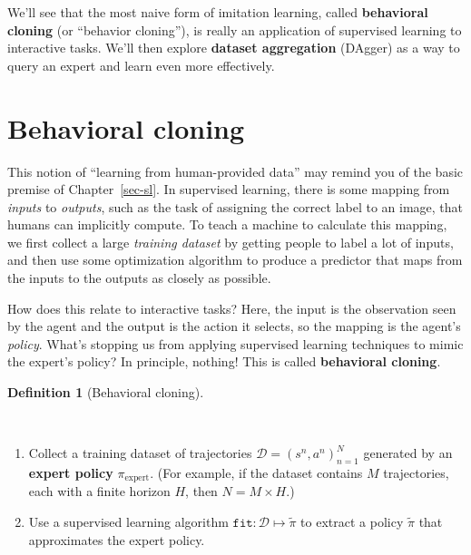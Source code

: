 \documentclass[
  letterpaper,
  DIV=11,
  numbers=noendperiod]{scrreprt}
\providecommand{\tightlist}{%
  \setlength{\itemsep}{0pt}\setlength{\parskip}{0pt}}\usepackage{longtable,booktabs,array}
\theoremstyle{plain}
\theoremstyle{plain}
\theoremstyle{definition}
\theoremstyle{definition}
\newtheorem{definition}{Definition}[chapter]
\theoremstyle{remark}
\begin{document}
We'll see that the most naive form of imitation learning, called
\textbf{behavioral cloning} (or ``behavior cloning''), is really an
application of supervised learning to interactive tasks. We'll then
explore \textbf{dataset aggregation} (DAgger) as a way to query an
expert and learn even more effectively.

\section{Behavioral cloning}\label{behavioral-cloning}

This notion of ``learning from human-provided data'' may remind you of
the basic premise of Chapter~\ref{sec-sl}. In supervised learning, there
is some mapping from \emph{inputs} to \emph{outputs}, such as the task
of assigning the correct label to an image, that humans can implicitly
compute. To teach a machine to calculate this mapping, we first collect
a large \emph{training dataset} by getting people to label a lot of
inputs, and then use some optimization algorithm to produce a predictor
that maps from the inputs to the outputs as closely as possible.

How does this relate to interactive tasks? Here, the input is the
observation seen by the agent and the output is the action it selects,
so the mapping is the agent's \emph{policy}. What's stopping us from
applying supervised learning techniques to mimic the expert's policy? In
principle, nothing! This is called \textbf{behavioral cloning}.

\begin{definition}[Behavioral
cloning]\protect\hypertarget{def-behavioral_cloning}{}\label{def-behavioral_cloning}

~

\begin{enumerate}
\def\labelenumi{\arabic{enumi}.}
\tightlist
\item
  Collect a training dataset of trajectories
  \(\mathcal{D} = (s^n, a^n)_{n=1}^{N}\) generated by an \textbf{expert
  policy} \(\pi_\text{expert}\). (For example, if the dataset contains
  \(M\) trajectories, each with a finite horizon \(H\), then
  \(N = M \times H\).)
\item
  Use a supervised learning algorithm
  \(\texttt{fit} : \mathcal{D} \mapsto \widetilde{\pi}\) to extract a
  policy \(\widetilde{\pi}\) that approximates the expert policy.
\end{enumerate}

\end{definition}
\end{document}
